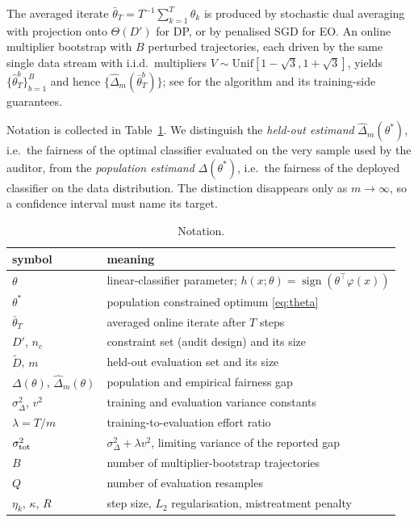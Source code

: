 \documentclass[pdflatex,sn-basic]{sn-jnl}
\newcommand{\dhat}{\hat\Delta}
\newcommand{\tbar}{\bar\theta}
\newcommand{\Dp}{D'}
\newcommand{\Dt}{\tilde D}
\begin{document}

The averaged iterate $\tbar_T=T^{-1}\sum_{k=1}^T\theta_k$ is produced by
stochastic dual averaging with projection onto $\Theta(\Dp)$ for DP, or by penalised SGD for EO.  An
online multiplier bootstrap with $B$ perturbed trajectories, each driven by the same single data
stream with i.i.d.\ multipliers $V\sim\mathrm{Unif}[1-\sqrt3,1+\sqrt3]$, yields
$\{\hat\theta^b_T\}_{b=1}^B$ and hence $\{\dhat_m(\bar\theta^b_T)\}$; see \citet{roy2026uq} for the
algorithm and its training-side guarantees.


Notation is collected in Table~\ref{tab:notation}.  We distinguish the \emph{held-out estimand} $\dhat_m(\theta^*)$, i.e.\ the
fairness of the optimal classifier evaluated on the very sample used by the auditor, from the
\emph{population estimand} $\Delta(\theta^*)$, i.e.\ the fairness of the deployed classifier on the
data distribution.  The distinction disappears only as $m\to\infty$, so a confidence interval must name its target.

\begin{table}[t]
\centering
\small
\caption{Notation.}
\label{tab:notation}
\begin{tabular}{ll}
\toprule
symbol & meaning \\
\midrule
$\theta$ & linear-classifier parameter; $h(x;\theta)=\operatorname{sign}(\theta^\top\varphi(x))$ \\
$\theta^*$ & population constrained optimum \eqref{eq:theta} \\
$\tbar_T$ & averaged online iterate after $T$ steps \\
$\Dp$, $n_c$ & constraint set (audit design) and its size \\
$\Dt$, $m$ & held-out evaluation set and its size \\
$\Delta(\theta)$, $\dhat_m(\theta)$ & population and empirical fairness gap \\
$\sigma^2_\Delta$, $v^2$ & training and evaluation variance constants \\
$\lambda=T/m$ & training-to-evaluation effort ratio \\
$\sigma^2_{\rm tot}$ & $\sigma^2_\Delta+\lambda v^2$, limiting variance of the reported gap \\
$B$ & number of multiplier-bootstrap trajectories \\
$Q$ & number of evaluation resamples \\
$\eta_k$, $\kappa$, $R$ & step size, $L_2$ regularisation, mistreatment penalty \\
\bottomrule
\end{tabular}
\end{table}
\end{document}
